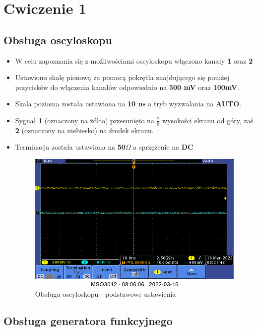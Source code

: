 \chapter{Cwiczenie 1}

\section{Obsługa oscyloskopu}
\label{sec:obsluga_oscyloskopu}
\begin{itemize}
\item W celu zapoznania się z możliwościami oscyloskopu włączono kanały \textbf{1} oraz \textbf{2} 
\item Ustawiono skalę pionową za pomocą pokrętła znajdującego się poniżej przycisków do włączenia kanałów odpowiednio na \textbf{500 mV} oraz \textbf{100mV}.
\item Skala pozioma została ustawiona na \textbf{10 ns} a tryb wyzwalania na \textbf{AUTO}.
\item Sygnał \textbf{1} (oznaczony na żółto) przesunięto na $\frac{2}{8}$ wysokości ekranu od góry, zaś \textbf{2} (oznaczony na niebiesko) na środek ekranu.
\item Terminacja została ustawiona na \textbf{50$\Omega$} a sprzężenie na \textbf{DC}

\begin{figure}[h]
    \centering
    \includegraphics[scale=0.6]{images/1_1_wmenu_smaller.png}
    \caption{Obsługa oscyloskopu - podstawowe ustawienia}
    \label{fig:1_1}
\end{figure}
\end{itemize}

\section{Obsługa generatora funkcyjnego}

